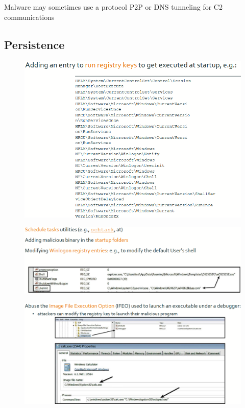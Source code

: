 \documentclass[]{project_plan}
\begin{document}
Malware may sometimes use a protocol P2P or DNS tunneling for C2 communications

\subsection{Persistence}

\begin{figure}[H]
  \centering
  \includegraphics[width=\linewidth]{persistence.png}
\end{figure}
\begin{figure}[H]
  \centering
  \includegraphics[width=\linewidth]{persistence 2.png}
\end{figure}
\begin{figure}[H]
  \centering
  \includegraphics[width=\linewidth]{persistence 3.png}
\end{figure}
\end{document}
